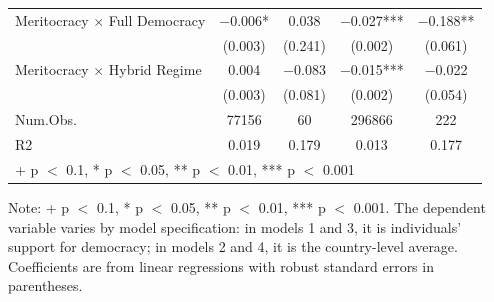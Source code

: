 \begin{table}[!h]
\begin{threeparttable}
\begin{tabular}[t]{lcccc}
Meritocracy $\times$ Full Democracy & −0.006* & 0.038 & −0.027*** & −0.188**\\
 & (0.003) & (0.241) & (0.002) & (0.061)\\
Meritocracy $\times$ Hybrid Regime & 0.004 & −0.083 & −0.015*** & −0.022\\
 & (0.003) & (0.081) & (0.002) & (0.054)\\
Num.Obs. & 77156 & 60 & 296866 & 222\\
R2 & 0.019 & 0.179 & 0.013 & 0.177\\
\bottomrule
\multicolumn{5}{l}{\rule{0pt}{1em}+ p $<$ 0.1, * p $<$ 0.05, ** p $<$ 0.01, *** p $<$ 0.001}\\
\end{tabular}
\begin{tablenotes}
\small
\item Note: + p $<$ 0.1, * p $<$ 0.05, ** p $<$ 0.01, *** p $<$ 0.001. The dependent variable varies by model specification: in models 1 and 3, it is individuals' support for democracy; in models 2 and 4, it is the country-level average. Coefficients are from linear regressions with robust standard errors in parentheses.
\end{tablenotes}
\end{threeparttable}
\end{table}
